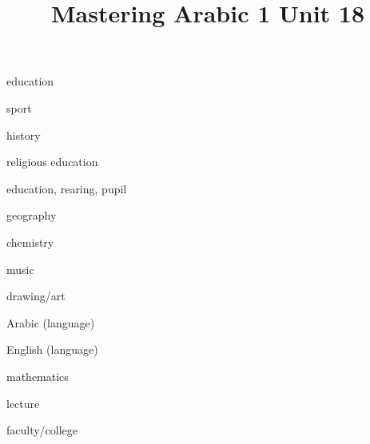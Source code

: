 \documentclass[avery5371,grid,frame]{flashcards}
\title{Mastering Arabic 1 Unit 18}
\begin{document}
\begin{flashcard}{\LARGE education}
\LARGE {}
\end{flashcard}
\begin{flashcard}{\LARGE sport}
\LARGE {}
\end{flashcard}
\begin{flashcard}{\LARGE history}
\LARGE {}
\end{flashcard}
\begin{flashcard}{\LARGE religious education}
\LARGE {}
\end{flashcard}
\begin{flashcard}{\LARGE education, rearing, pupil}
\LARGE {}
\end{flashcard}
\begin{flashcard}{\LARGE geography}
\LARGE {}
\end{flashcard}
\begin{flashcard}{\LARGE chemistry}
\LARGE {}
\end{flashcard}
\begin{flashcard}{\LARGE music}
\LARGE {}
\end{flashcard}
\begin{flashcard}{\LARGE drawing/art}
\LARGE {}
\end{flashcard}
\begin{flashcard}{\LARGE Arabic (language)}
\LARGE {}
\end{flashcard}
\begin{flashcard}{\LARGE English (language)}
\LARGE {}
\end{flashcard}
\begin{flashcard}{\LARGE mathematics}
\LARGE {}
\end{flashcard}
\begin{flashcard}{\LARGE lecture}
\LARGE {}
\end{flashcard}
\begin{flashcard}{\LARGE faculty/college}
\LARGE {}
\end{flashcard}
\end{document}
